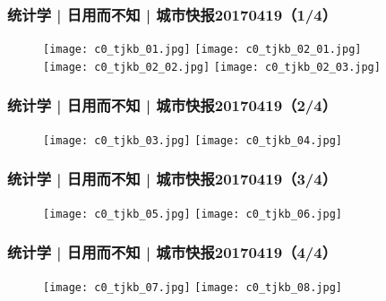 \begin{frame}
  \frametitle{统计学 | 日用而不知 | 城市快报20170419（1/4）}
  \begin{figure}
    \centering
    \texttt{[image: c0\_tjkb\_01.jpg]}\quad
    \texttt{[image: c0\_tjkb\_02\_01.jpg]}\\
    \texttt{[image: c0\_tjkb\_02\_02.jpg]}\quad
    \texttt{[image: c0\_tjkb\_02\_03.jpg]}\\
  \end{figure}
\end{frame}

\begin{frame}
  \frametitle{统计学 | 日用而不知 | 城市快报20170419（2/4）}
  \begin{figure}
    \centering
    \texttt{[image: c0\_tjkb\_03.jpg]}\quad
    \texttt{[image: c0\_tjkb\_04.jpg]}
  \end{figure}
\end{frame}

\begin{frame}
  \frametitle{统计学 | 日用而不知 | 城市快报20170419（3/4）}
  \begin{figure}
    \centering
    \texttt{[image: c0\_tjkb\_05.jpg]}\quad
    \texttt{[image: c0\_tjkb\_06.jpg]}
  \end{figure}
\end{frame}

\begin{frame}
  \frametitle{统计学 | 日用而不知 | 城市快报20170419（4/4）}
  \begin{figure}
    \centering
    \texttt{[image: c0\_tjkb\_07.jpg]}\quad
    \texttt{[image: c0\_tjkb\_08.jpg]}
  \end{figure}
\end{frame}

